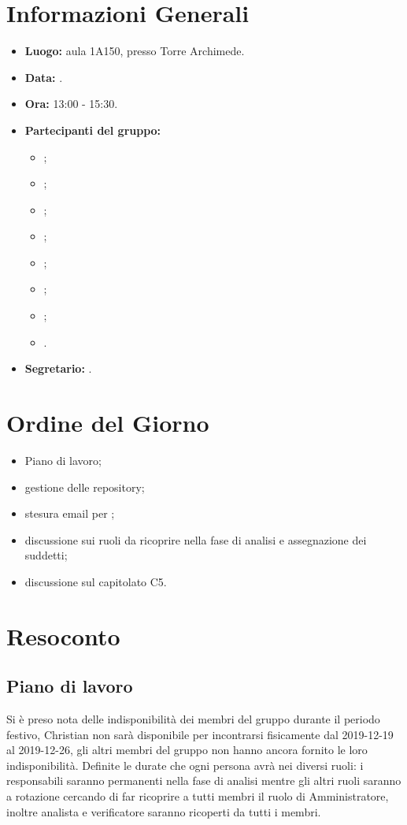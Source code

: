\section{Informazioni Generali}
\begin{itemize}
\item \textbf{Luogo:} aula 1A150, presso Torre Archimede.
\item \textbf{Data:} \Data.
\item \textbf{Ora:} 13:00 - 15:30.
\item \textbf{Partecipanti del gruppo:}
	\begin{itemize}
		\item \AT{}; 
		\item \BR{};
		\item \CE{}; 
		\item \DF{};
		\item \LD{};
		\item \MC{};
		\item \PF{};
		\item \SE{}.
	\end{itemize} 
\item \textbf{Segretario:} \LD{}.
\end{itemize}


\section{Ordine del Giorno}
\begin{itemize}
\item Piano di lavoro;
\item gestione delle repository;
\item stesura email per \Proponente{};
\item discussione sui ruoli da ricoprire nella fase di analisi e assegnazione dei suddetti;
\item discussione sul capitolato C5.
\end{itemize}



\section{Resoconto}
\subsection{Piano di lavoro}
Si è preso nota delle indisponibilità dei membri del gruppo durante il periodo festivo, Christian non sarà disponibile per incontrarsi fisicamente dal 2019-12-19 al 2019-12-26, gli altri membri del gruppo non hanno ancora fornito le loro indisponibilità. 
Definite le durate che ogni persona avrà nei diversi ruoli: i responsabili saranno permanenti nella fase di analisi mentre gli altri ruoli saranno a rotazione cercando di far ricoprire a tutti membri il ruolo di Amministratore, inoltre analista e verificatore saranno ricoperti da tutti i membri.  \\

